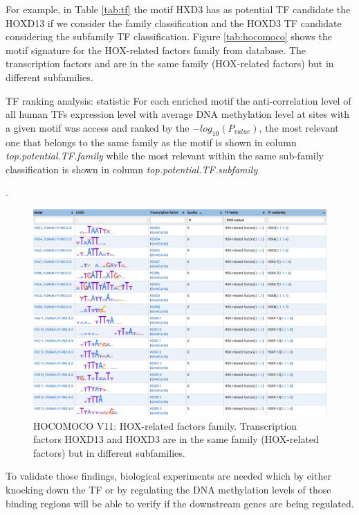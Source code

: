 For example, in Table \ref{tab:tf} the motif HXD3 has as potential TF candidate the HOXD13 if we consider the family  classification and the HOXD3 TF candidate considering the subfamily TF classification. Figure \ref{tab:hocomoco} shows the motif signature for the HOX-related factors family from  database. The transcription factors  and  are in the same family (HOX-related factors) but in different subfamilies.



\begin{table}[h!]
\centering
\caption[G-CIMP analysis: TF ranking plot]{TF ranking analysis: statistic For each enriched motif the anti-correlation level of all human TFs expression level with average DNA methylation level at sites with a given motif was access and ranked by the $-log_{10}(P_{value})$, the most relevant one that belongs to the same family as the motif is shown in column \textit{top.potential.TF.family} while the most relevant within the same sub-family classification is shown in column \textit{top.potential.TF.subfamily}}.
\label{tab:tf}
\end{table}

\begin{center}
\begin{figure}[h!]
\includegraphics[width=16cm]{images/HOCOMOCO.png}
\caption[HOCOMOCO: HOX-related factors family]{HOCOMOCO V11: HOX-related factors family. Transcription factors HOXD13 and HOXD3 are in the same family (HOX-related factors) but in different subfamilies.}
\end{figure}
\label{tab:hocomoco}
\end{center}

To validate those findings, biological experiments are needed which by either knocking down the TF or by regulating the DNA methylation levels of those binding regions will be able to verify if the downstream genes are being regulated.
